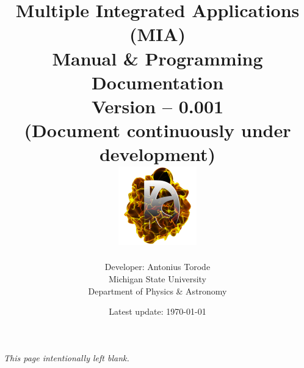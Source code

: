 \documentclass[openany,a4paper,11pt]{book}
\title{Multiple Integrated Applications (MIA) \\  Manual \& Programming Documentation \\ Version -- 0.001 \\ (Document continuously under development) \\ \vspace{1cm}  \includegraphics[scale=1]{./Images/logo.png}}
\author{Developer: Antonius Torode \\ Michigan State University \\ Department of Physics \& Astronomy}
\date{Latest update: \today}
\begin{document}
\frontmatter
\maketitle

\tableofcontents
\newpage
\vspace*{\fill}
\begin{center}
	\textit{This page intentionally left blank.}
\end{center}
\vspace*{\fill}

\mainmatter
\pagestyle{fancy}
\fancyhf{}
\fancyhead[RO, LE]{\thepage}






\backmatter


\end{document}
